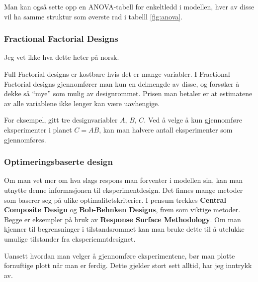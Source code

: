 Man kan også sette opp en ANOVA-tabell for enkeltledd i modellen, hver av disse vil ha samme struktur som øverste rad i tabelll \ref{fig:anova}.

\subsubsection{Fractional Factorial Designs}
Jeg vet ikke hva dette heter på norsk.

Full Factorial designs er kostbare hvis det er mange variabler. I Fractional Factorial designs gjennomfører man kun en delmengde av disse, og forsøker å dekke så ``mye'' som mulig av designrommet. Prisen man betaler er at estimatene av alle variablene ikke lenger kan være uavhengige.

For eksempel, gitt tre designvariabler $A$, $B$, $C$. Ved å velge å kun gjennomføre eksperimenter i planet $C = AB$, kan man halvere antall eksperimenter som gjennomføres.

\subsubsection{Optimeringsbaserte design}
Om man vet mer om hva slags respons man forventer i modellen sin, kan man utnytte denne informasjonen til eksperimentdesign. Det finnes mange metoder som baserer seg på ulike optimalitetskriterier. I pensum trekkes \textbf{Central Composite Design} og \textbf{Bob-Behnken Designs}, frem som viktige metoder. Begge er eksempler på bruk av \textbf{Response Surface Methodology}. Om man kjenner til begrensninger i tilstandsrommet kan man bruke dette til å utelukke umulige tilstander fra eksperiemntdesignet.

Uansett hvordan man velger å gjennomføre eksperimentene, bør man plotte fornuftige plott når man er ferdig. Dette gjelder stort sett alltid, har jeg inntrykk av.


